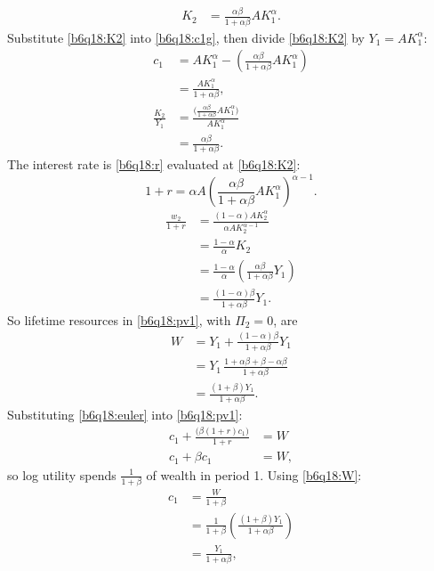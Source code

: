 \begin{sol}
\begin{align}
K_2&=\frac{\alpha\beta}{1+\alpha\beta}AK_1^\alpha. \label{b6q18:K2}
\end{align}
Substitute \eqref{b6q18:K2} into \eqref{b6q18:c1g}, then divide \eqref{b6q18:K2} by $Y_1=AK_1^\alpha$:
\begin{align}
c_1&=AK_1^\alpha-\left(\frac{\alpha\beta}{1+\alpha\beta}AK_1^\alpha\right)\nonumber\\
&=\frac{AK_1^\alpha}{1+\alpha\beta}, \label{b6q18:c1}\\
\frac{K_2}{Y_1}&=\frac{\big(\frac{\alpha\beta}{1+\alpha\beta}AK_1^\alpha\big)}{AK_1^\alpha}\nonumber\\
&=\frac{\alpha\beta}{1+\alpha\beta}. \label{b6q18:s}
\end{align}
The interest rate is \eqref{b6q18:r} evaluated at \eqref{b6q18:K2}:
\[
1+r=\alpha A\left(\frac{\alpha\beta}{1+\alpha\beta}AK_1^\alpha\right)^{\alpha-1}.
\]
\begin{align}
\frac{w_2}{1+r}&=\frac{(1-\alpha)AK_2^\alpha}{\alpha AK_2^{\alpha-1}}\nonumber\\
&=\frac{1-\alpha}{\alpha}K_2\nonumber\\
&=\frac{1-\alpha}{\alpha}\left(\frac{\alpha\beta}{1+\alpha\beta}Y_1\right)\nonumber\\
&=\frac{(1-\alpha)\beta}{1+\alpha\beta}Y_1. \label{b6q18:hw}
\end{align}
So lifetime resources in \eqref{b6q18:pv1}, with $\Pi_2=0$, are
\begin{align}
W&=Y_1+\frac{(1-\alpha)\beta}{1+\alpha\beta}Y_1\nonumber\\
&=Y_1\,\frac{1+\alpha\beta+\beta-\alpha\beta}{1+\alpha\beta}\nonumber\\
&=\frac{(1+\beta)Y_1}{1+\alpha\beta}. \label{b6q18:W}
\end{align}
Substituting \eqref{b6q18:euler} into \eqref{b6q18:pv1}:
\begin{align*}
c_1+\frac{\big(\beta(1+r)c_1\big)}{1+r}&=W\\
c_1+\beta c_1&=W,
\end{align*}
so log utility spends $\frac1{1+\beta}$ of wealth in period 1.
Using \eqref{b6q18:W}:
\begin{align*}
c_1&=\frac{W}{1+\beta}\\
&=\frac1{1+\beta}\left(\frac{(1+\beta)Y_1}{1+\alpha\beta}\right)\\
&=\frac{Y_1}{1+\alpha\beta},

\end{align*}
\end{sol}
